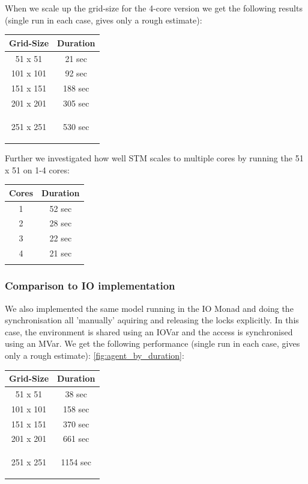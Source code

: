 When we scale up the grid-size for the 4-core version we get the following results (single run in each case, gives only a rough estimate): 
\begin{center}
  \begin{tabular}{ c || c }
    Grid-Size & Duration \\ \hline \hline 
    51 x 51 & 21 sec \\ \hline
    101 x 101 & 92 sec \\ \hline
    151 x 151 & 188 sec \\ \hline
    201 x 201 & 305 sec \\ \hline
    251 x 251 & 530 sec 
    
    \label{tab:agent_by_duration_stm}
  \end{tabular}
\end{center}

Further we investigated how well STM scales to multiple cores by running the 51 x 51 on 1-4 cores:
\begin{center}
  \begin{tabular}{ c || c }
    Cores & Duration \\ \hline \hline 
    1 & 52 sec \\ \hline
    2 & 28 sec \\ \hline
    3 & 22 sec \\ \hline
    4 & 21 sec \\ \hline
    
    \label{tab:cores_by_duration_stm}
  \end{tabular}
\end{center}

\subsubsection{Comparison to IO implementation}
We also implemented the same model running in the IO Monad and doing the synchronisation all 'manually' aquiring and releasing the locks explicitly. In this case, the environment is shared using an IOVar and the access is synchronised using an MVar. We get the following performance (single run in each case, gives only a rough estimate):
\ref{fig:agent_by_duration}:
\begin{center}
  \begin{tabular}{ c || c }
    Grid-Size & Duration \\ \hline \hline 
    51 x 51 & 38 sec \\ \hline
    101 x 101 & 158 sec \\ \hline
    151 x 151 & 370 sec \\ \hline
    201 x 201 & 661 sec \\ \hline
    251 x 251 & 1154 sec 
    
    \label{tab:agent_by_duration_io}
  \end{tabular}
\end{center}

